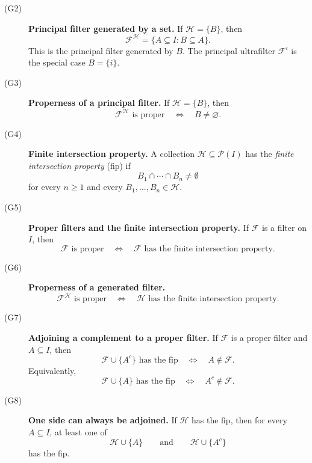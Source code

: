 {\begin{description}
    \item[\textnormal{(G2)}] \textbf{Principal filter generated by a set.}
    If \(\mathcal{H}=\{B\}\), then
    \[
    \mathcal{F}^{\mathcal{H}}
    =
    \{A\subseteq I:B\subseteq A\}.
    \]
    This is the principal filter generated by \(B\). The principal
    ultrafilter \(\mathcal{F}^{i}\) is the special case \(B=\{i\}\).

    \item[\textnormal{(G3)}] \textbf{Properness of a principal filter.}
If \(\mathcal{H}=\{B\}\), then
\[
\mathcal{F}^{\mathcal{H}} \text{ is proper}
\quad\Longleftrightarrow\quad
B\neq\varnothing.
\]

    \item[\textnormal{(G4)}] \textbf{Finite intersection property.}
    A collection \(\mathcal{H}\subseteq\mathcal{P}(I)\) has the
    \emph{finite intersection property} (fip) if
    \[
    B_1\cap\cdots\cap B_n\neq\emptyset
    \]
    for every \(n\geq 1\) and every
    \(B_1,\ldots,B_n\in\mathcal{H}\).

    \item[\textnormal{(G5)}]
\textbf{Proper filters and the finite intersection property.}
If \(\mathcal{F}\) is a filter on \(I\), then
\[
\mathcal{F}\text{ is proper}
\quad\Longleftrightarrow\quad
\mathcal{F}\text{ has the finite intersection property}.
\]

    \item[\textnormal{(G6)}] \textbf{Properness of a generated filter.}
    \[
    \mathcal{F}^{\mathcal{H}}\text{ is proper}
    \quad\Longleftrightarrow\quad
    \mathcal{H}\text{ has the finite intersection property}.
    \]

    \item[\textnormal{(G7)}] \textbf{Adjoining a complement to a proper filter.}
    If \(\mathcal{F}\) is a proper filter and \(A\subseteq I\), then
    \[
    \mathcal{F}\cup\{A^c\}\text{ has the fip}
    \quad\Longleftrightarrow\quad
    A\notin\mathcal{F}.
    \]
    Equivalently,
    \[
    \mathcal{F}\cup\{A\}\text{ has the fip}
    \quad\Longleftrightarrow\quad
    A^c\notin\mathcal{F}.
    \]

    \item[\textnormal{(G8)}] \textbf{One side can always be adjoined.}
    If \(\mathcal{H}\) has the fip, then for every \(A\subseteq I\), at
    least one of
    \[
    \mathcal{H}\cup\{A\}
    \qquad\text{and}\qquad
    \mathcal{H}\cup\{A^c\}
    \]
    has the fip.
\end{description}

}
